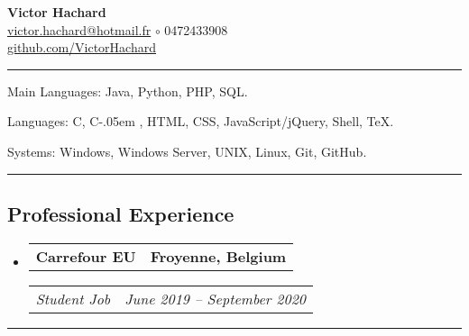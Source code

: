 \documentclass[10pt,letterpaper]{article}
\makeatletter
\newcommand{\Csharp}{%
  {\settoheight{\dimen0}{C}C\kern-.05em \resizebox{!}{\dimen0}{\raisebox{\depth}{\#}}}}
\newenvironment{indentsection}[1]
{\begin{list}{}
  {\setlength{\leftmargin}{#1}} \item[]
}
{\end{list}}
\newcommand{\headerrow}[2]
{\begin{tabular*}{\linewidth}{l@{\extracolsep{\fill}}r}
  #1 &
  #2 \\
\end{tabular*}}
\makeatother
\begin{document}
\begin{center}
  \huge \textbf{Victor Hachard} \\
  \large
  \href{mailto:victor.hachard@hotmail.fr}{victor.hachard@hotmail.fr}
  $\circ$
  0472433908
  \\
  \href{http://www.github.com/VictorHachard}{github.com/VictorHachard}
  \vspace{-0.2em}
\end{center}


\hrule
\begin{indentsection}{\parindent}
\begin{description*}
  \item[Main Languages:] Java, Python, PHP, SQL.
  \item[Languages:] C, \Csharp, HTML, CSS, JavaScript/jQuery, Shell, TeX.
  \item[Systems:] Windows, Windows Server, UNIX, Linux, Git, GitHub.
\end{description*}
\end{indentsection}


\hrule
\vspace{-0.4em}
\subsection*{Professional Experience}
\begin{itemize}
  \parskip=0.1em

  \item
  \headerrow
    {\textbf{Carrefour EU}}
    {\textbf{Froyenne, Belgium}}
  \headerrow
    {\emph{Student Job}}
    {\emph{June 2019 -- September 2020}}
  \end{itemize}


\hrule
\vspace{-0.4em}
\end{document}
